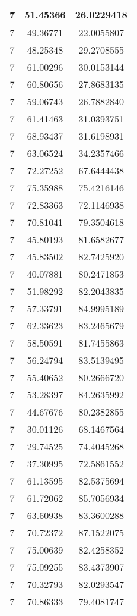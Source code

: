 \documentclass[
]{book}
\begin{document}
\begin{tabular}{c|c|c}
\hline
7 & 51.45366 & 26.0229418\\
\hline
7 & 49.36771 & 22.0055807\\
\hline
7 & 48.25348 & 29.2708555\\
\hline
7 & 61.00296 & 30.0153144\\
\hline
7 & 60.80656 & 27.8683135\\
\hline
7 & 59.06743 & 26.7882840\\
\hline
7 & 61.41463 & 31.0393751\\
\hline
7 & 68.93437 & 31.6198931\\
\hline
7 & 63.06524 & 34.2357466\\
\hline
7 & 72.27252 & 67.6444438\\
\hline
7 & 75.35988 & 75.4216146\\
\hline
7 & 72.83363 & 72.1146938\\
\hline
7 & 70.81041 & 79.3504618\\
\hline
7 & 45.80193 & 81.6582677\\
\hline
7 & 45.83502 & 82.7425920\\
\hline
7 & 40.07881 & 80.2471853\\
\hline
7 & 51.98292 & 82.2043835\\
\hline
7 & 57.33791 & 84.9995189\\
\hline
7 & 62.33623 & 83.2465679\\
\hline
7 & 58.50591 & 81.7455863\\
\hline
7 & 56.24794 & 83.5139495\\
\hline
7 & 55.40652 & 80.2666720\\
\hline
7 & 53.28397 & 84.2635992\\
\hline
7 & 44.67676 & 80.2382855\\
\hline
7 & 30.01126 & 68.1467564\\
\hline
7 & 29.74525 & 74.4045268\\
\hline
7 & 37.30995 & 72.5861552\\
\hline
7 & 61.13595 & 82.5375694\\
\hline
7 & 61.72062 & 85.7056934\\
\hline
7 & 63.60938 & 83.3600288\\
\hline
7 & 70.72372 & 87.1522075\\
\hline
7 & 75.00639 & 82.4258352\\
\hline
7 & 75.09255 & 83.4373907\\
\hline
7 & 70.32793 & 82.0293547\\
\hline
7 & 70.86333 & 79.4081747\\

\end{tabular}
\end{document}
